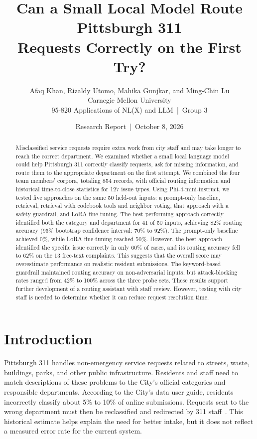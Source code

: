 \documentclass[11pt,letterpaper]{article}
\title{\sffamily\bfseries Can a Small Local Model Route Pittsburgh 311\\Requests Correctly on the First Try?}
\author{%
  Afaq Khan, Rizaldy Utomo, Mahika Gunjkar, and Ming-Chin Lu\\[0.4em]
  Carnegie Mellon University\\
  95-820 Applications of NL(X) and LLM \,|\, Group 3%
}
\date{Research Report \,|\, October 8, 2026}
\begin{document}
\maketitle

\begin{abstract}
\noindent Misclassified service requests require extra work from city staff and may take longer to reach the correct department. We examined whether a small local language model could help Pittsburgh 311 correctly classify requests, ask for missing information, and route them to the appropriate department on the first attempt. We combined the four team members' corpora, totaling 854 records, with official routing information and historical time-to-close statistics for 127 issue types. Using Phi-4-mini-instruct, we tested five approaches on the same 50 held-out inputs: a prompt-only baseline, retrieval, retrieval with codebook tools and neighbor voting, that approach with a safety guardrail, and LoRA fine-tuning. The best-performing approach correctly identified both the category and department for 41 of 50 inputs, achieving 82\% routing accuracy (95\% bootstrap confidence interval: 70\% to 92\%). The prompt-only baseline achieved 0\%, while LoRA fine-tuning reached 50\%. However, the best approach identified the specific issue correctly in only 60\% of cases, and its routing accuracy fell to 62\% on the 13 free-text complaints. This suggests that the overall score may overestimate performance on realistic resident submissions. The keyword-based guardrail maintained routing accuracy on non-adversarial inputs, but attack-blocking rates ranged from 42\% to 100\% across the three probe sets. These results support further development of a routing assistant with staff review. However, testing with city staff is needed to determine whether it can reduce request resolution time.
\end{abstract}

\section{Introduction}

Pittsburgh 311 handles non-emergency service requests related to streets, waste, buildings, parks, and other public infrastructure. Residents and staff need to match descriptions of these problems to the City's official categories and responsible departments. According to the City's data user guide, residents incorrectly classify about 5\% to 10\% of online submissions. Requests sent to the wrong department must then be reclassified and redirected by 311 staff~\cite{wprdc}. This historical estimate helps explain the need for better intake, but it does not reflect a measured error rate for the current system.
\end{document}
